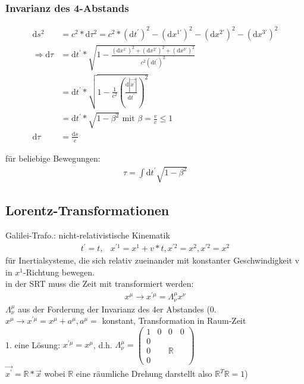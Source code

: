 \documentclass[a4paper]{article}
\begin{document}
\subsubsection{Invarianz des 4-Abstands} 
\begin{align}
\mathrm{d}s^2&=c^2*\mathrm{d}\tau^2=c^2*(\mathrm{d}t^{'})^2-(\mathrm{d}x^{1'})^2-(\mathrm{d}x^{2'})^2-(\mathrm{d}x^{3'})^2\\
\Rightarrow
\mathrm{d}\tau&=\mathrm{d}t^{'}*\sqrt{1-\frac{(\mathrm{d}x^{1'})^2+(\mathrm{d}x^{2'})^2+(\mathrm{d}x^{3'})^2}{c^2
(\mathrm{d}t^{'})^2}}\\
&=\mathrm{d}t^{'}*\sqrt{1-\frac{1}{c^2}\left(\frac{\mathrm{d}|\vec{x^{'}}|}{\mathrm{d}t^{'}}\right)^2}\\
&=\mathrm{d}t^{'}*\sqrt{1-\beta^2}\text{ mit }\beta=\frac{v}{c}\leq1 \\
\mathrm{d}\tau&=\frac{\mathrm{d}s}{c}
\end{align}

für beliebige Bewegungen:
\begin{align}
\tau=\int \mathrm{d}t^{'}\sqrt{1-\beta^2}
\end{align}
\subsection{Lorentz-Transformationen}
Galilei-Trafo.: nicht-relativistische Kinematik
\begin{align}
t^{'}=t, & x^{'1}=x^1+v*t, x^{'2}=x^2,x^{'2}=x^2
\end{align}
für Inertialsysteme, die sich relativ zueinander mit konstanter Geschwindigkeit
v in $x^1$-Richtung bewegen.\\
in der SRT muss die Zeit mit transformiert werden:
\begin{align}
x^{\mu}\rightarrow x^{'\mu}=\Lambda^\mu_\nu x^\nu
\end{align}
$\Lambda^\mu_\nu$ aus der Forderung der Invarianz des 4er Abstandes
(0. $x^{\mu}\rightarrow x^{'\mu}=x^{\mu}+a^{\mu}, a^\mu=$ konstant,
Transformation in Raum-Zeit\\
1. eine Lösung: $x^{'\mu}=x^{\mu}$, d.h. $\Lambda^\mu_\nu= \begin{pmatrix} 1 &
0& 0&0\\ 0& \\ 0& &  \mathbb{R} \\ 0 \end{pmatrix}$ \\
$\vec{x^{'}}= \mathbb{R}*\vec{x}$ wobei $ \mathbb{R}$ eine räumliche Drehung
darstellt also $ \mathbb{R}^T \mathbb{R}= 1$)\\
\end{document}
